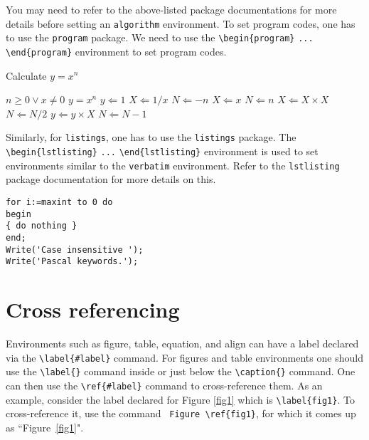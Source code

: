 \documentclass[unnumsec,webpdf,contemporary,large]{oup-authoring-template}%
\theoremstyle{thmstyleone}%
\theoremstyle{thmstyletwo}%
\theoremstyle{thmstylethree}%
\begin{document}
You may need to refer to the above-listed package documentations for more details before setting an \verb+algorithm+ environment.
To set program codes, one has to use the \verb+program+ package. We need to use the \verb+\begin{program}+ \verb+...+
\verb+\end{program}+ environment to set program codes.

\begin{algorithm}[!t]
	\caption{Calculate $y = x^n$}\label{algo1}
	\begin{algorithmic}[1]
		\Require $n \geq 0 \vee x \neq 0$
		\Ensure $y = x^n$
		\State $y \Leftarrow 1$
		\State $X \Leftarrow 1 / x$
		\State $N \Leftarrow -n$
		\Else
		\State $X \Leftarrow x$
		\State $N \Leftarrow n$
		\EndIf
		\State $X \Leftarrow X \times X$
		\State $N \Leftarrow N / 2$
		\Else[$N$ is odd]
		\State $y \Leftarrow y \times X$
		\State $N \Leftarrow N - 1$
		\EndIf
		\EndWhile
	\end{algorithmic}
\end{algorithm}

Similarly, for \verb+listings+, one has to use the \verb+listings+ package. The \verb+\begin{lstlisting}+ \verb+...+ \verb+\end{lstlisting}+ environment is used to set environments similar to the \verb+verbatim+ environment. Refer to the \verb+lstlisting+ package documentation for more details on this.


\begin{minipage}{\hsize}%
	\lstset{language=Pascal}%
	\begin{lstlisting}[frame=single,framexleftmargin=-1pt,framexrightmargin=-17pt,framesep=12pt,linewidth=0.98\textwidth]
for i:=maxint to 0 do
begin
{ do nothing }
end;
Write('Case insensitive ');
Write('Pascal keywords.');
\end{lstlisting}
\end{minipage}


\section{Cross referencing}\label{sec8}

Environments such as figure, table, equation, and align can have a label
declared via the \verb+\label{#label}+ command. For figures and table
environments one should use the \verb+\label{}+ command inside or just
below the \verb+\caption{}+ command.  One can then use the
\verb+\ref{#label}+ command to cross-reference them. As an example, consider
the label declared for Figure \ref{fig1} which is
\verb+\label{fig1}+. To cross-reference it, use the command
\verb+ Figure \ref{fig1}+, for which it comes up as
``Figure~\ref{fig1}".
\end{document}

